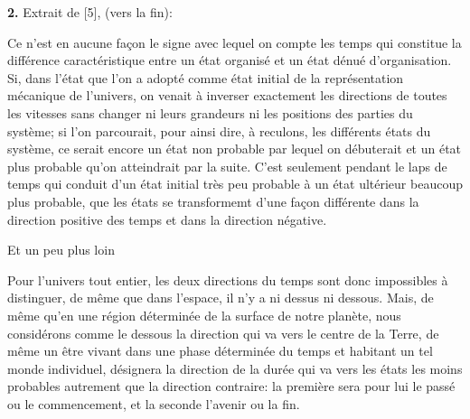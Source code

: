 {\bf 2.}\hskip3mm Extrait de [5], (vers la fin):
\medskip
{\cit  Ce n'est en aucune fa\c con le signe avec lequel on compte les temps
qui constitue la diff\'erence caract\'eristique entre un \'etat organis\'e 
et un \'etat d\'enu\'e d'organisation. Si, dans l'\'etat que l'on a adopt\'e 
comme \'etat initial de la repr\'esentation m\'ecanique de l'univers, on 
venait \`a inverser exactement les directions de toutes les vitesses sans 
changer ni leurs grandeurs ni les positions des parties du syst\`eme; si 
l'on parcourait, pour ainsi dire, \`a reculons, les diff\'erents \'etats du 
syst\`eme, ce serait encore un \'etat non probable par lequel on d\'ebuterait 
et un \'etat plus probable qu'on atteindrait par la suite. C'est seulement 
pendant le laps de temps qui conduit d'un \'etat initial tr\`es peu probable 
\`a un \'etat ult\'erieur beaucoup plus probable, que les \'etats se 
transformemt d'une fa\c con diff\'erente dans la direction positive des 
temps et dans la direction n\'egative. \par }
\medskip
Et un peu plus loin 
\medskip
{\cit
Pour l'univers tout entier, les deux directions du temps sont donc 
impossibles \`a distinguer, de m\^eme que dans l'espace, il n'y a ni dessus 
ni dessous. Mais, de m\^eme qu'en une r\'egion d\'etermin\'ee de la surface 
de notre plan\`ete, nous consid\'erons comme le dessous la direction qui 
va vers le centre de la Terre, de m\^eme un \^etre vivant dans une phase 
d\'etermin\'ee du temps et habitant un tel monde individuel, d\'esignera la 
direction de la dur\'ee qui va vers les \'etats les moins probables autrement 
que la direction contraire: la premi\`ere sera pour lui le pass\'e ou le 
commencement, et la seconde l'avenir ou la fin. \par  }

\bigskip

